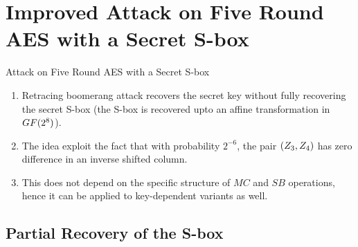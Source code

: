 \documentclass[notheorems]{beamer}
\theoremstyle{definition}
\theoremstyle{example}
\begin{document}
    \section[Secret S-Boxes]{Improved Attack on Five Round AES with a Secret S-box}
    \label{sec:secret-s-box}

    \begin{frame}[<+->]{Attack on Five Round AES with a Secret S-box}
        \begin{enumerate}
            \item Retracing boomerang attack recovers the secret key without
            fully recovering the secret S-box (the S-box is recovered upto an
            affine transformation in \(GF(2^8)\)).
            \item The idea exploit the fact that with probability \(2^{-6}\),
            the pair \((Z_3, Z_4)\) has zero difference in an inverse
            shifted column.
            \item This does not depend on the specific structure of \(MC\) and
            \(SB\) operations, hence it can be applied to key-dependent variants
            as well.
        \end{enumerate}
    \end{frame}

    \subsection{Partial Recovery of the S-box}
    \label{subsec:s-box-recovery}
\end{document}
